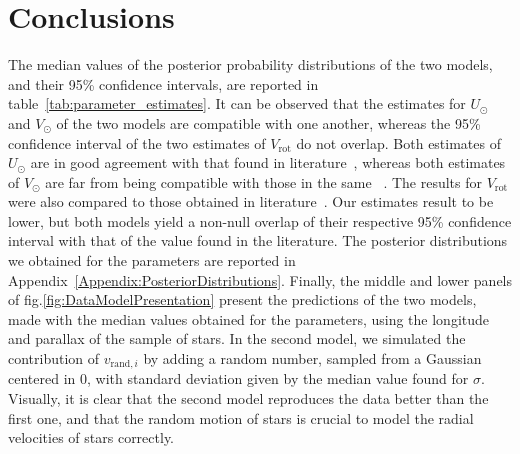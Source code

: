 \section{Conclusions}

The median values of the posterior probability distributions of the two models, and their 95\% confidence intervals, are reported in table~\ref{tab:parameter_estimates}. It can be observed that the estimates for $U_\odot$ and $V_\odot$ of the two models are compatible with one another, whereas the 95\% confidence interval of the two estimates of $V_{\text{rot}}$ do not overlap. Both estimates of $U_\odot$ are in good agreement with that found in literature~\cite{LocalKinematics}, whereas both estimates of $V_\odot$ are far from being compatible with those in the same ~\cite{LocalKinematics}. The results for $V_{\text{rot}}$ were also compared to those obtained in literature~\cite{GalacticKinematics}. Our estimates result to be lower, but both models yield a non-null overlap of their respective 95\% confidence interval with that of the value found in the literature. The posterior distributions we obtained for the parameters are reported in Appendix~\ref{Appendix:PosteriorDistributions}.
Finally, the middle and lower panels of fig.\ref{fig:DataModelPresentation} present the predictions of the two models, made with the median values obtained for the parameters, using the longitude and parallax of the sample of stars. In the second model, we simulated the contribution of $v_{\text{rand}, i}$ by adding a random number, sampled from a Gaussian centered in 0, with standard deviation given by the median value found for $\sigma$. Visually, it is clear that the second model reproduces the data better than the first one, and that the random motion of stars is crucial to model the radial velocities of stars correctly. 

